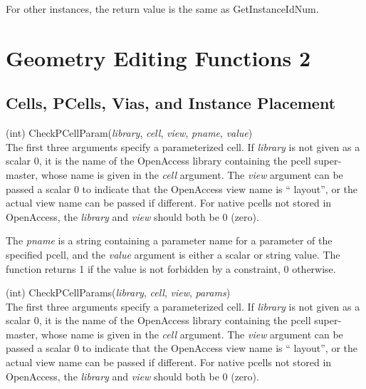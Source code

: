 \begin{description}
For other instances, the return value is the same as {\vt
GetInstanceIdNum}.
\end{description}

\section{Geometry Editing Functions 2}
\subsection{Cells, PCells, Vias, and Instance Placement}

\begin{description}
\item{(int) \vt CheckPCellParam({\it library\/}, {\it cell\/},
{\it view\/}, {\it pname\/}, {\it value\/})}\\
The first three arguments specify a parameterized cell.
If {\it library} is not given as a scalar 0, it is the name of the
OpenAccess library containing the pcell super-master, whose name is
given in the {\it cell} argument.  The {\it view} argument can be
passed a scalar 0 to indicate that the OpenAccess view name is ``{\vt
layout}'', or the actual view name can be passed if different.  For
{\Xic} native pcells not stored in OpenAccess, the {\it library} and
{\it view} should both be 0 (zero).

The {\it pname} is a string containing a parameter name for a
parameter of the specified pcell, and the {\it value} argument is
either a scalar or string value.  The function returns 1 if the value
is not forbidden by a constraint, 0 otherwise.

\item{(int) \vt CheckPCellParams({\it library\/}, {\it cell\/},
{\it view\/}, {\it params\/})}\\
The first three arguments specify a parameterized cell.
If {\it library} is not given as a scalar 0, it is the name of the
OpenAccess library containing the pcell super-master, whose name is
given in the {\it cell} argument.  The {\it view} argument can be
passed a scalar 0 to indicate that the OpenAccess view name is ``{\vt
layout}'', or the actual view name can be passed if different.  For
{\Xic} native pcells not stored in OpenAccess, the {\it library} and
{\it view} should both be 0 (zero).


\end{description}
